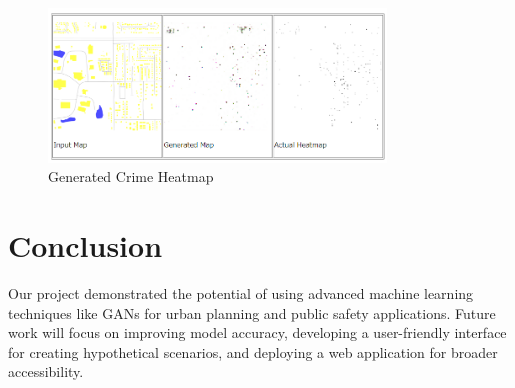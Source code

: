 \documentclass{article}
\begin{document}
\begin{figure}[!htbp]
    \centering
    \includegraphics[width=0.8\textwidth]{Figures/Generated heats.png}
    \caption{Generated Crime Heatmap}
    \label{fig:heatmap}
\end{figure}

\section{Conclusion}

Our project demonstrated the potential of using advanced machine learning techniques like GANs for urban planning and public safety applications. Future work will focus on improving model accuracy, developing a user-friendly interface for creating hypothetical scenarios, and deploying a web application for broader accessibility.
\end{document}
